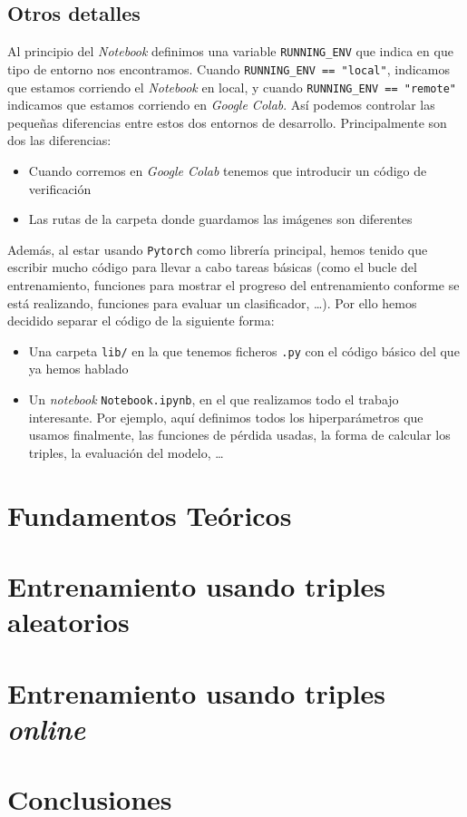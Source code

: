 \documentclass[11pt]{article}
\begin{document}
\subsection{Otros detalles}

Al principio del \emph{Notebook} definimos una variable \lstinline{RUNNING_ENV} que indica en que tipo de entorno nos encontramos. Cuando \lstinline{RUNNING_ENV == "local"}, indicamos que estamos corriendo el \emph{Notebook} en local, y cuando \lstinline{RUNNING_ENV == "remote"} indicamos que estamos corriendo en \emph{Google Colab}. Así podemos controlar las pequeñas diferencias entre estos dos entornos de desarrollo. Principalmente son dos las diferencias:

\begin{itemize}
    \item Cuando corremos en \emph{Google Colab} tenemos que introducir un código de verificación
    \item Las rutas de la carpeta donde guardamos las imágenes son diferentes
\end{itemize}

Además, al estar usando \lstinline{Pytorch} como librería principal, hemos tenido que escribir mucho código para llevar a cabo tareas básicas (como el bucle del entrenamiento, funciones para mostrar el progreso del entrenamiento conforme se está realizando, funciones para evaluar un clasificador, \ldots). Por ello hemos decidido separar el código de la siguiente forma:

\begin{itemize}
  \item Una carpeta \lstinline{lib/} en la que tenemos ficheros \lstinline{.py} con el código básico del que ya hemos hablado
  \item Un \emph{notebook} \lstinline{Notebook.ipynb}, en el que realizamos todo el trabajo interesante. Por ejemplo, aquí definimos todos los hiperparámetros que usamos finalmente, las funciones de pérdida usadas, la forma de calcular los triples, la evaluación del modelo, \ldots
\end{itemize}


\pagebreak

\section{Fundamentos Teóricos} \label{fundamentos_teoricos:seccion}




\pagebreak

\section{Entrenamiento usando triples aleatorios}

\pagebreak

\section{Entrenamiento usando triples \emph{online}}

\pagebreak

\section{Conclusiones}



\end{document}
